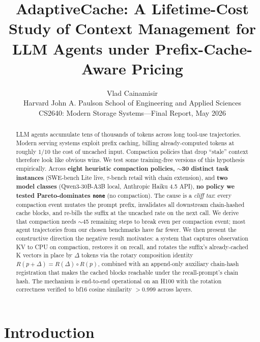 \documentclass[letterpaper,twocolumn,10pt]{article}
\begin{document}
\date{}

\title{\Large \bf AdaptiveCache: A Lifetime-Cost Study of Context Management
       for LLM Agents under Prefix-Cache-Aware Pricing}

\author{
  {\rm Vlad Cainamisir}\\
  Harvard John A. Paulson School of Engineering and Applied Sciences\\
  {\small CS2640: Modern Storage Systems\quad---\quad Final Report, May 2026}
}

\maketitle

\begin{abstract}
LLM agents accumulate tens of thousands of tokens across long
tool-use trajectories. Modern serving systems exploit prefix caching,
billing already-computed tokens at roughly $1/10$ the cost of
uncached input. Compaction policies that drop ``stale'' context
therefore look like obvious wins. We test some training-free
versions of this hypothesis empirically. Across \textbf{eight
heuristic compaction policies, $\sim$30 distinct task instances}
(SWE-bench Lite live, $\tau$-bench retail with chain extension), and
\textbf{two model classes} (Qwen3-30B-A3B local, Anthropic Haiku 4.5
API), \textbf{no policy we tested Pareto-dominates \texttt{none}} (no
compaction). The cause is a \emph{cliff tax}: every compaction event
mutates the prompt prefix, invalidates all downstream chain-hashed
cache blocks, and re-bills the suffix at the uncached rate on the
next call. We derive that compaction needs $\sim$45 remaining steps
to break even per compaction event; most agent trajectories from our chosen benchmarks have far
fewer. We then present the constructive direction the negative result
motivates: a system that captures observation KV to CPU on
compaction, restores it on recall, and rotates the suffix's
already-cached K vectors in place by $\Delta$ tokens via the rotary
composition identity $R(p+\Delta) = R(\Delta) \circ R(p)$, combined
with an append-only auxiliary chain-hash registration that makes the
cached blocks reachable under the recall-prompt's chain hash. The
mechanism is end-to-end operational on an H100 with the rotation
correctness verified to bf16 cosine similarity $>$0.999 across
layers.
\end{abstract}

\section{Introduction}
\label{sec:intro}
\end{document}
